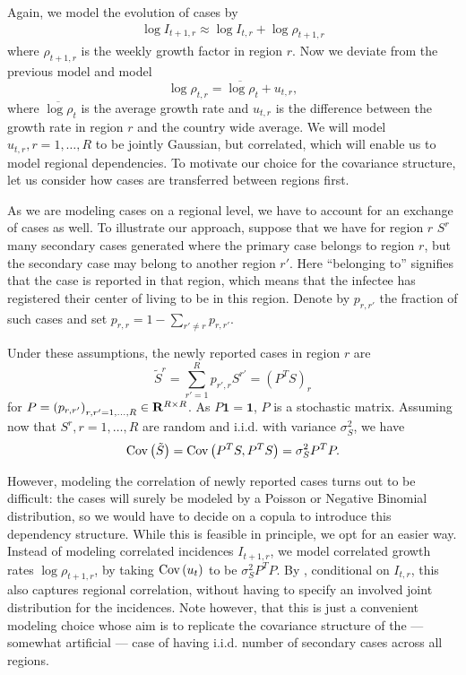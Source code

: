 Again, we model the evolution of cases by 
\begin{align}
    \label{eq:log-growth-regional-model}
    \log I_{t + 1, r} \approx \log I_{t, r} + \log \rho_{t + 1, r}
\end{align}
where $\rho_{t+1, r}$ is the weekly growth factor in region $r$. Now we deviate from the previous model and model 
$$
    \log \rho_{t, r} = \overline{\log \rho}_{t} + u_{t, r},
$$
where $\overline{\log\rho}_{t}$ is the average growth rate and $u_{t,r}$ is the difference between the growth rate in region $r$ and the country wide average. 
We will model $u_{t,r}, r = 1, \dots, R$ to be jointly Gaussian, but correlated, which will enable us to model regional dependencies. To motivate our choice for the covariance structure, let us consider how cases are transferred between regions first.

As we are modeling cases on a regional level, we have to account for an exchange of cases as well. To illustrate our approach, suppose that we have for region $r$ $S^{r}$ many secondary cases generated where the primary case belongs to region $r$, but the secondary case may belong to another region $r'$. Here ``{}belonging to''{} signifies that the case is reported in that region, which means that the infectee has registered their center of living to be in this region. Denote by $p_{r,r'}$ the fraction of such cases and set $p_{r,r} = 1 - \sum_{r' \neq r} p_{r,r'}$. 

Under these assumptions, the newly reported cases in region $r$ are 
$$
    \tilde S^{r} = \sum_{r'=1}^{R} p_{r',r} S^{r'} = (P^{T}S)_{r}
$$
for $ P = \left( p_{r, r'} \right)_{r,r' = 1, \dots, R} \in \mathbf R^{R\times R}$. As $P \mathbf 1 = \mathbf 1$, $P$ is a stochastic matrix. Assuming now that $S^{r}, r= 1, \dots, R$ are random and i.i.d. with variance $\sigma^{2}_S$, we have 
$$
    \operatorname{Cov} \left( \tilde S\right) = \operatorname{Cov} \left( P^{T}S, P^{T}S \right) = \sigma^{2}_SP^{T}P.
$$

However, modeling the correlation of newly reported cases turns out to be difficult: the cases will surely be modeled by a Poisson or Negative Binomial distribution, so we would have to decide on a copula to introduce this dependency structure. While this is feasible in principle, we opt for an easier way. Instead of modeling correlated incidences $I_{t + 1, r}$, we model correlated growth rates $\log \rho_{t + 1, r}$, by taking $\operatorname{Cov} \left( u_{t} \right)$ to be $\sigma^{2}_SP^{T}P$. By , conditional on $I_{t,r}$, this also captures regional correlation, without having to specify an involved joint distribution for the incidences. Note however, that this is just a convenient modeling choice whose aim is to replicate the covariance structure of the --- somewhat artificial --- case of having i.i.d. number of secondary cases across all regions.

